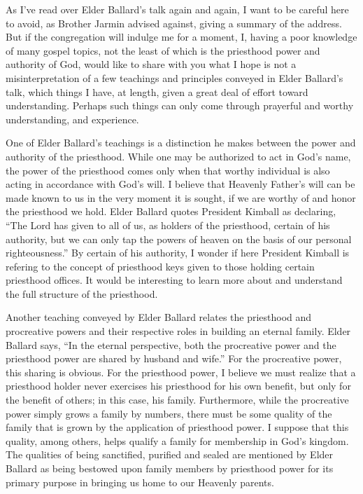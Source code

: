 \documentclass[12pt]{article}
\begin{document}
As I've read over Elder Ballard's talk again and again, I want to be careful here to
avoid, as Brother Jarmin advised against, giving a summary of the address.  But if the
congregation will indulge me for a moment, I, having a
poor knowledge of many gospel topics, not the least of which is the priesthood
power and authority of God, would like to share with you what I hope is not
a misinterpretation of a few teachings and principles conveyed in Elder Ballard's talk,
which things I have, at length, given a great deal of effort toward understanding.
Perhaps such things can only come through prayerful and worthy understanding,
and experience.

One of Elder Ballard's teachings is a distinction he makes between the power and
authority of the priesthood.  While one may be authorized to act in God's name,
the power of the priesthood comes only when that worthy individual is also acting in
accordance with God's will.  I believe that Heavenly Father's will can be made known
to us in the very moment it is sought, if we are worthy of and honor the priesthood we hold.
Elder Ballard quotes President Kimball as declaring, ``The Lord has given to all of us, as holders of
the priesthood, certain of his authority, but we can only tap the powers of heaven on the basis
of our personal righteousness.''  By certain of his authority, I wonder if here President Kimball
is refering to the concept of priesthood keys given to those holding certain priesthood offices.
It would be interesting to learn more about and understand the full structure of the priesthood.

Another teaching conveyed by Elder Ballard relates the priesthood and procreative powers
and their respective roles in building an eternal family.  Elder Ballard says, ``In the
eternal perspective, both the procreative power and the priesthood power are shared by husband
and wife.''  
For the procreative power, this sharing is obvious.  For the priesthood power, I believe
we must realize that a priesthood holder never exercises his priesthood for his own benefit,
but only for the benefit of others; in this case, his family.  Furthermore, while the procreative
power simply grows a family by numbers, there must be some quality of the family that is grown
by the application of priesthood power.  I suppose that this quality, among others, helps qualify a family
for membership in God's kingdom.  The qualities of being sanctified, purified and sealed
are mentioned by Elder Ballard as being bestowed upon family members by priesthood power for
its primary purpose in bringing us home to our Heavenly parents.





\end{document}
